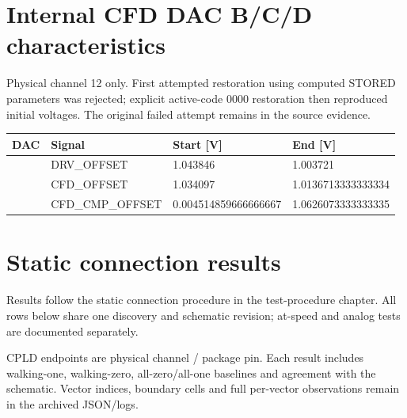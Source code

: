 \section{Internal CFD DAC B/C/D characteristics}
Physical channel 12 only. First attempted restoration using computed STORED parameters was rejected; explicit active-code 0000 restoration then reproduced initial voltages. The original failed attempt remains in the source evidence.

\begin{longtable}{>{\raggedright\arraybackslash}p{.12\linewidth}>{\raggedright\arraybackslash}p{.35\linewidth}>{\raggedright\arraybackslash}p{.21\linewidth}>{\raggedright\arraybackslash}p{.21\linewidth}}
\toprule
DAC & Signal & Start [V] & End [V]\\\midrule
\endhead
{B} & {DRV\_OFFSET} & {1.043846} & {1.003721}\\
{C} & {CFD\_OFFSET} & {1.034097} & {1.0136713333333334}\\
{D} & {CFD\_CMP\_OFFSET} & {0.004514859666666667} & {1.0626073333333335}\\
\bottomrule
\end{longtable}
\clearpage
\section{Static connection results}
Results follow the static connection procedure in the test-procedure chapter. All rows below share one discovery and schematic revision; at-speed and analog tests are documented separately.

CPLD endpoints are physical channel / package pin. Each result includes walking-one, walking-zero, all-zero/all-one baselines and agreement with the schematic. Vector indices, boundary cells and full per-vector observations remain in the archived JSON/logs.

